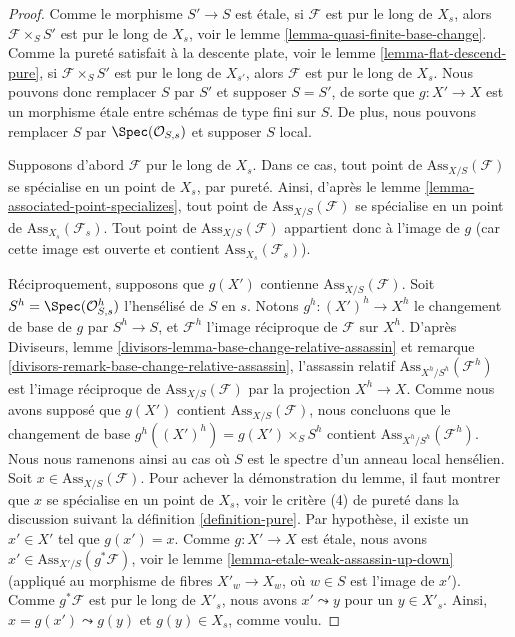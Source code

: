 \begin{proof}
Comme le morphisme $S' \to S$ est \'etale, si $\mathcal{F}$
est pur le long de $X_s$, alors $\mathcal{F} \times_S S'$ est pur le long de
$X_s$, voir le
lemme \ref{lemma-quasi-finite-base-change}.
Comme la pureté satisfait à la descente plate, voir le
lemme \ref{lemma-flat-descend-pure},
si $\mathcal{F} \times_S S'$ est pur le long de $X_{s'}$, alors
$\mathcal{F}$ est pur le long de $X_s$. Nous pouvons donc remplacer $S$ par $S'$
et supposer $S = S'$, de sorte que $g : X' \to X$ est un morphisme \'etale
entre schémas de type fini sur $S$. De plus, nous pouvons remplacer
$S$ par $\Spec(\mathcal{O}_{S, s})$ et supposer $S$ local.

\medskip\noindent
Supposons d'abord $\mathcal{F}$ pur le long de $X_s$.
Dans ce cas, tout point de $\text{Ass}_{X/S}(\mathcal{F})$
se spécialise en un point de $X_s$, par pureté. Ainsi, d'après le
lemme \ref{lemma-associated-point-specializes},
tout point de $\text{Ass}_{X/S}(\mathcal{F})$
se spécialise en un point de $\text{Ass}_{X_s}(\mathcal{F}_s)$.
Tout point de $\text{Ass}_{X/S}(\mathcal{F})$ appartient donc à
l'image de $g$ (car cette image est ouverte et contient
$\text{Ass}_{X_s}(\mathcal{F}_s)$).

\medskip\noindent
Réciproquement, supposons que $g(X')$ contienne $\text{Ass}_{X/S}(\mathcal{F})$.
Soit $S^h = \Spec(\mathcal{O}_{S, s}^h)$ l'hensélisé
de $S$ en $s$. Notons $g^h : (X')^h \to X^h$ le changement de base de $g$
par $S^h \to S$, et $\mathcal{F}^h$ l'image réciproque de $\mathcal{F}$
sur $X^h$. D'après
Diviseurs, lemme \ref{divisors-lemma-base-change-relative-assassin} et
remarque \ref{divisors-remark-base-change-relative-assassin},
l'assassin relatif $\text{Ass}_{X^h/S^h}(\mathcal{F}^h)$
est l'image réciproque de $\text{Ass}_{X/S}(\mathcal{F})$ par la projection
$X^h \to X$. Comme nous avons supposé que $g(X')$ contient
$\text{Ass}_{X/S}(\mathcal{F})$, nous concluons que le changement de base
$g^h((X')^h) = g(X') \times_S S^h$ contient
$\text{Ass}_{X^h/S^h}(\mathcal{F}^h)$. Nous nous ramenons ainsi
au cas où $S$ est le spectre d'un anneau local hensélien.
Soit $x \in \text{Ass}_{X/S}(\mathcal{F})$. Pour achever la démonstration du
lemme, il faut montrer que $x$ se spécialise en un point de $X_s$, voir
le critère (4) de pureté dans la discussion suivant la
définition \ref{definition-pure}.
Par hypothèse, il existe un $x' \in X'$ tel que $g(x') = x$.
Comme $g : X' \to X$ est \'etale, nous avons
$x' \in \text{Ass}_{X'/S}(g^*\mathcal{F})$, voir le
lemme \ref{lemma-etale-weak-assassin-up-down} (appliqué au
morphisme de fibres $X'_w \to X_w$, où $w \in S$ est l'image de $x'$).
Comme $g^*\mathcal{F}$ est pur le long de $X'_s$, nous avons $x' \leadsto y$
pour un $y \in X'_s$. Ainsi, $x = g(x') \leadsto g(y)$ et
$g(y) \in X_s$, comme voulu.
\end{proof}

